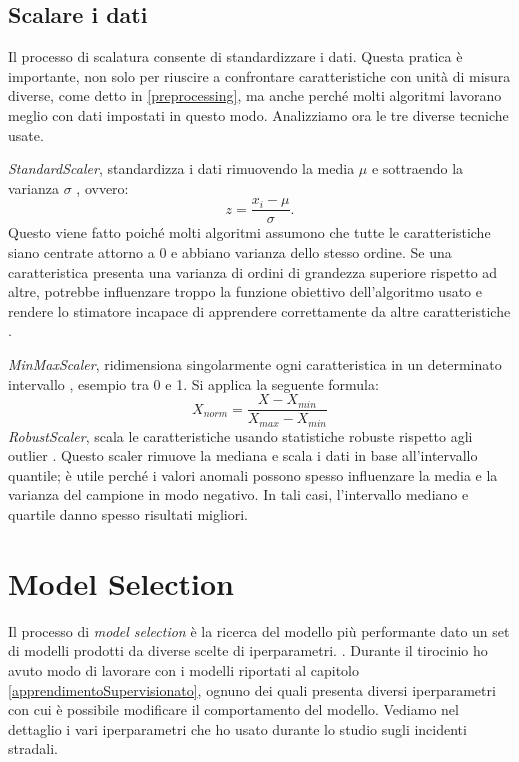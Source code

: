 \documentclass[12pt,italian]{report}
\begin{document}
\subsection{Scalare i dati}
Il processo di scalatura consente di standardizzare i dati. Questa pratica è importante, non solo per riuscire a confrontare caratteristiche con unità di misura diverse, come detto in \ref{preprocessing}, ma anche perché molti algoritmi lavorano meglio con dati impostati in questo modo.  
Analizziamo ora le tre diverse tecniche usate.

\emph{StandardScaler}, standardizza i dati rimuovendo la media $\mu$ e sottraendo la varianza $\sigma$ \cite{scikit-learn}, ovvero:
\begin{equation}
z = \frac{x_i - \mu}{\sigma}.
\end{equation}
Questo viene fatto poiché molti algoritmi assumono che tutte le caratteristiche siano centrate attorno a 0 e abbiano varianza dello stesso ordine. Se una caratteristica presenta una varianza di ordini di grandezza superiore rispetto ad altre, potrebbe influenzare troppo la funzione obiettivo dell'algoritmo usato e rendere lo stimatore incapace di apprendere correttamente da altre caratteristiche \cite{scikit-learn}.

\emph{MinMaxScaler}, ridimensiona singolarmente ogni caratteristica in un determinato intervallo \cite{scikit-learn}, esempio tra 0 e 1. Si applica la seguente formula:
\begin{equation}
X_{norm} = \frac{X - X_{min}}{X_{max} - X_{min}}
\end{equation}
\emph{RobustScaler}, scala le caratteristiche usando statistiche robuste rispetto agli outlier \cite{scikit-learn}. Questo scaler rimuove la mediana e scala i dati in base all'intervallo quantile; è utile perché i valori anomali possono spesso influenzare la media e la  varianza del campione in modo negativo. In tali casi, l'intervallo mediano e quartile danno spesso risultati migliori.

\section{Model Selection}
Il processo di \emph{model selection} è la ricerca del modello più performante dato un set di modelli prodotti da diverse scelte di iperparametri. \cite{Raschka2018ModelEM}.
Durante il tirocinio ho avuto modo di lavorare con i modelli riportati al capitolo \ref{apprendimentoSupervisionato}, ognuno dei quali presenta diversi iperparametri con cui è possibile modificare il comportamento del modello. Vediamo nel dettaglio i vari iperparametri che ho usato durante lo studio sugli incidenti stradali.
 
\end{document}
